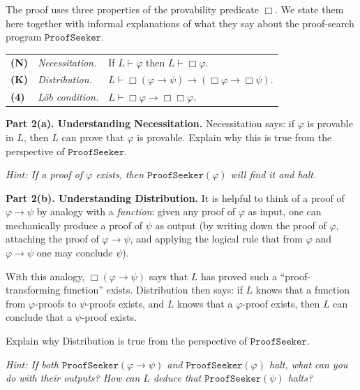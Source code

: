 \documentclass[8pt]{article}
\begin{document}
\medskip
\noindent
The proof uses three properties of the provability predicate $\Box$. We state them
here together with informal explanations of what they say about the proof-search
program $\texttt{ProofSeeker}$.

\medskip
\begin{center}
\begin{tabular}{lll}
  \textbf{(N)} & \emph{Necessitation.} & If $L \vdash \varphi$ then
    $L \vdash \Box\varphi$. \\
  \textbf{(K)} & \emph{Distribution.} & $L \vdash \Box(\varphi \to \psi) \to
    (\Box\varphi \to \Box\psi)$. \\
  \textbf{(4)} & \emph{L\"ob condition.} & $L \vdash \Box\varphi \to
    \Box\Box\varphi$.
\end{tabular}
\end{center}

\medskip
\noindent
\textbf{Part 2(a). Understanding Necessitation.} Necessitation says: if $\varphi$ is
provable in $L$, then $L$ can prove that $\varphi$ is provable. Explain why this is
true from the perspective of $\texttt{ProofSeeker}$.

\medskip
\noindent
\emph{Hint: If a proof of $\varphi$ exists, then $\texttt{ProofSeeker}(\varphi)$ will
find it and halt.}

\medskip
\noindent
\textbf{Part 2(b). Understanding Distribution.} It is helpful to think of a proof of
$\varphi \to \psi$ by analogy with a \emph{function}: given any proof of $\varphi$ as
input, one can mechanically produce a proof of $\psi$ as output (by writing down the
proof of $\varphi$, attaching the proof of $\varphi \to \psi$, and applying the
logical rule that from $\varphi$ and $\varphi \to \psi$ one may conclude $\psi$).

\medskip
\noindent
With this analogy, $\Box(\varphi \to \psi)$ says that $L$ has proved such a
``proof-transforming function'' exists. Distribution then says: if $L$ knows that a
function from $\varphi$-proofs to $\psi$-proofs exists, and $L$ knows that a
$\varphi$-proof exists, then $L$ can conclude that a $\psi$-proof exists.

\medskip
\noindent
Explain why Distribution is true from the perspective of $\texttt{ProofSeeker}$.

\medskip
\noindent
\emph{Hint: If both $\texttt{ProofSeeker}(\varphi \to \psi)$ and
$\texttt{ProofSeeker}(\varphi)$ halt, what can you do with their outputs? How can $L$ deduce that $\texttt{ProofSeeker}(\psi)$ halts?}
\end{document}
